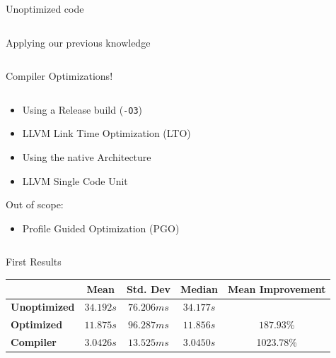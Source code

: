 \documentclass[compress,aspectratio=169]{beamer}
\begin{document}
\begin{frame}[fragile]{Unoptimized code}
  \begin{tcolorbox}[title=Unoptimized Version]
    \footnotesize\inputminted[xleftmargin=1em,linenos]{rust}{./assets/01nxn.rs}
  \end{tcolorbox}
\end{frame}

\begin{frame}[fragile]{Applying our previous knowledge}
  \begin{tcolorbox}[title=First optimized Version]
    \footnotesize\inputminted[xleftmargin=1em,linenos]{rust}{./assets/02nxn.rs}
  \end{tcolorbox}
\end{frame}

\begin{frame}{Compiler Optimizations!}
  \begin{columns}
    \begin{column}{0.5\textwidth}
  \begin{itemize}
    \item Using a Release build (\texttt{-O3})
    \item LLVM Link Time Optimization (LTO)
    \item Using the native Architecture
    \item LLVM Single Code Unit
  \end{itemize}
  Out of scope:
  \begin{itemize}
    \item Profile Guided Optimization (PGO)
  \end{itemize}
    \end{column}
    \begin{column}{0.5\textwidth}
    \footnotesize\inputminted[xleftmargin=1em,linenos]{toml}{./assets/cargo.toml}
    \end{column}
  \end{columns}
\end{frame}

\begin{frame}{First Results}
  \begin{table}[h]
\centering
\begin{tabular}{|l|c|c|c|c|}
\hline
  & \textbf{Mean} & \textbf{Std. Dev} & \textbf{Median} & \textbf{Mean Improvement}\\
\hline
  \textbf{Unoptimized} & $34.192s$ & $76.206ms$ & $34.177s$ & \\
  \hline
  \textbf{Optimized} & $11.875s$ & $96.287ms$ & $11.856s$ & $187.93$\%\\
  \hline
  \textbf{Compiler} &  $3.0426s$ & $13.525ms$ &  $3.0450s$ & 1023.78\%\\
\hline
\end{tabular}
\end{table}
\end{frame}
\end{document}
